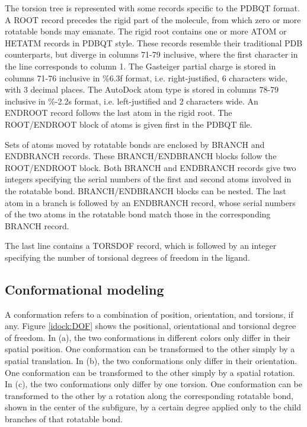 The torsion tree is represented with some records specific to the PDBQT format. A ROOT record precedes the rigid part of the molecule, from which zero or more rotatable bonds may emanate. The rigid root contains one or more ATOM or HETATM records in PDBQT style. These records resemble their traditional PDB counterparts, but diverge in columns 71-79 inclusive, where the first character in the line corresponds to column 1. The Gasteiger partial charge is stored in columns 71-76 inclusive in \%6.3f format, i.e. right-justified, 6 characters wide, with 3 decimal places. The AutoDock atom type is stored in columns 78-79 inclusive in \%-2.2s format, i.e. left-justified and 2 characters wide. An ENDROOT record follows the last atom in the rigid root. The ROOT/ENDROOT block of atoms is given first in the PDBQT file.

Sets of atoms moved by rotatable bonds are enclosed by BRANCH and ENDBRANCH records. These BRANCH/ENDBRANCH blocks follow the ROOT/ENDROOT block. Both BRANCH and ENDBRANCH records give two integers specifying the serial numbers of the first and second atoms involved in the rotatable bond. BRANCH/ENDBRANCH blocks can be nested. The last atom in a branch is followed by an ENDBRANCH record, whose serial numbers of the two atoms in the rotatable bond match those in the corresponding BRANCH record.

The last line contains a TORSDOF record, which is followed by an integer specifying the number of torsional degrees of freedom in the ligand.

\subsection{Conformational modeling}

A conformation refers to a combination of position, orientation, and torsions, if any. Figure \ref{idock:DOF} shows the positional, orientational and torsional degree of freedom. In (a), the two conformations in different colors only differ in their spatial position. One conformation can be transformed to the other simply by a spatial translation. In (b), the two conformations only differ in their orientation. One conformation can be transformed to the other simply by a spatial rotation. In (c), the two conformations only differ by one torsion. One conformation can be transformed to the other by a rotation along the corresponding rotatable bond, shown in the center of the subfigure, by a certain degree applied only to the child branches of that rotatable bond.

